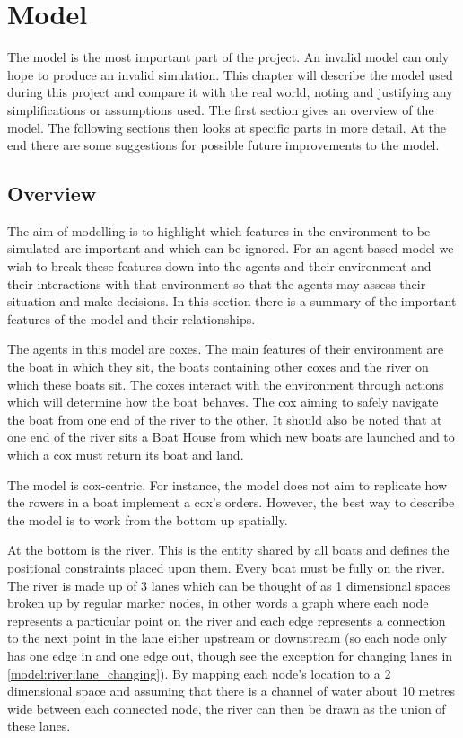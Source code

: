 \chapter{Model} \label{chapter:model}
  The model is the most important part of the project. An invalid model can only hope to produce an invalid simulation. This chapter will describe the model used during this project and compare it with the real world, noting and justifying any simplifications or assumptions used. The first section gives an overview of the model. The following sections then looks at specific parts in more detail. At the end there are some suggestions for possible future improvements to the model.
  
  \section{Overview}
    The aim of modelling is to highlight which features in the environment to be simulated are important and which can be ignored\cite{Sterling2009}. For an agent-based model we wish to break these features down into the agents and their environment and their interactions with that environment so that the agents may assess their situation and make decisions\cite{Bonabeau2002}. In this section there is a summary of the important features of the model and their relationships.
    
    The agents in this model are coxes. The main features of their environment are the boat in which they sit, the boats containing other coxes and the river on which these boats sit. The coxes interact with the environment through actions which will determine how the boat behaves. The cox aiming to safely navigate the boat from one end of the river to the other. It should also be noted that at one end of the river sits a Boat House from which new boats are launched and to which a cox must return its boat and land.
    
    The model is cox-centric. For instance, the model does not aim to replicate how the rowers in a boat implement a cox's orders. However, the best way to describe the model is to work from the bottom up spatially.
    
    At the bottom is the river. This is the entity shared by all boats and defines the positional constraints placed upon them. Every boat must be fully on the river. The river is made up of 3 lanes which can be thought of as 1 dimensional spaces broken up by regular marker nodes, in other words a graph where each node represents a particular point on the river and each edge represents a connection to the next point in the lane either upstream or downstream (so each node only has one edge in and one edge out, though see the exception for changing lanes in \ref{model:river:lane_changing}). By mapping each node's location to a 2 dimensional space and assuming that there is a channel of water about 10 metres wide between each connected node, the river can then be drawn as the union of these lanes.
    
